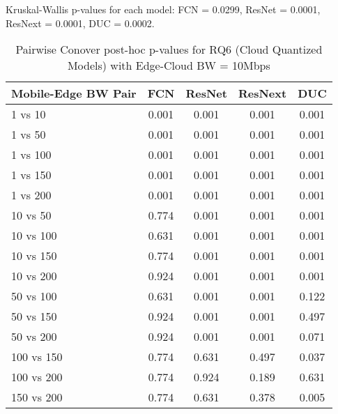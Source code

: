 \begin{table}[h]
\centering
\caption{Pairwise Conover post-hoc p-values for RQ6 (Cloud Quantized Models) with Edge-Cloud BW = 10Mbps}
\label{tab:conover_cloud_quantized_ec10}
\smallskip
Kruskal-Wallis p-values for each model: FCN = 0.0299, ResNet = 0.0001, ResNext = 0.0001, DUC = 0.0002.

\begin{tabular}{lcccc}
\toprule
Mobile-Edge BW Pair & FCN & ResNet & ResNext & DUC \\
\midrule
1 vs 10 & 0.001 & 0.001 & 0.001 & 0.001 \\
1 vs 50 & 0.001 & 0.001 & 0.001 & 0.001 \\
1 vs 100 & 0.001 & 0.001 & 0.001 & 0.001 \\
1 vs 150 & 0.001 & 0.001 & 0.001 & 0.001 \\
1 vs 200 & 0.001 & 0.001 & 0.001 & 0.001 \\
10 vs 50 & 0.774 & 0.001 & 0.001 & 0.001 \\
10 vs 100 & 0.631 & 0.001 & 0.001 & 0.001 \\
10 vs 150 & 0.774 & 0.001 & 0.001 & 0.001 \\
10 vs 200 & 0.924 & 0.001 & 0.001 & 0.001 \\
50 vs 100 & 0.631 & 0.001 & 0.001 & 0.122 \\
50 vs 150 & 0.924 & 0.001 & 0.001 & 0.497 \\
50 vs 200 & 0.924 & 0.001 & 0.001 & 0.071 \\
100 vs 150 & 0.774 & 0.631 & 0.497 & 0.037 \\
100 vs 200 & 0.774 & 0.924 & 0.189 & 0.631 \\
150 vs 200 & 0.774 & 0.631 & 0.378 & 0.005 \\
\bottomrule
\end{tabular}
\end{table}

